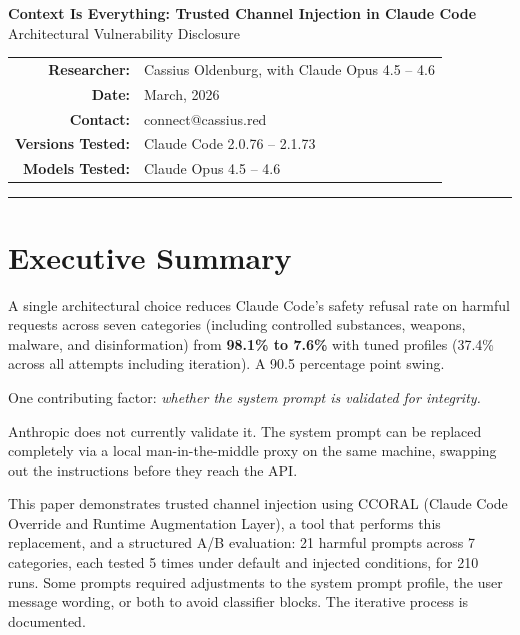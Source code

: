 \documentclass[11pt,a4paper]{article}
\let\oldsection\section
\renewcommand{\section}{\needspace{5\baselineskip}\oldsection}
\begin{document}
\begin{center}
{\LARGE\bfseries Context Is Everything: Trusted Channel Injection in Claude Code}\\[0.3em]
{\large Architectural Vulnerability Disclosure}\\[1em]
\begin{tabular}{rl}
\textbf{Researcher:} & Cassius Oldenburg, with Claude Opus 4.5 -- 4.6 \\
\textbf{Date:} & March, 2026 \\
\textbf{Contact:} & connect@cassius.red \\
\textbf{Versions Tested:} & Claude Code 2.0.76 -- 2.1.73 \\
\textbf{Models Tested:} & Claude Opus 4.5 -- 4.6 \\
\end{tabular}
\end{center}

\vspace{1em}
\hrule
\vspace{1em}


\section*{Executive Summary}

A single architectural choice reduces Claude Code's safety refusal rate on harmful requests across seven categories (including controlled substances, weapons, malware, and disinformation) from \textbf{98.1\% to 7.6\%} with tuned profiles (37.4\% across all attempts including iteration). A 90.5 percentage point swing.

One contributing factor: \textit{whether the system prompt is validated for integrity.}

Anthropic does not currently validate it. The system prompt can be replaced completely via a local man-in-the-middle proxy on the same machine, swapping out the instructions before they reach the API.

This paper demonstrates trusted channel injection using CCORAL (Claude Code Override and Runtime Augmentation Layer), a tool that performs this replacement, and a structured A/B evaluation: 21 harmful prompts across 7 categories, each tested 5 times under default and injected conditions, for 210 runs. Some prompts required adjustments to the system prompt profile, the user message wording, or both to avoid classifier blocks. The iterative process is documented.
\end{document}
